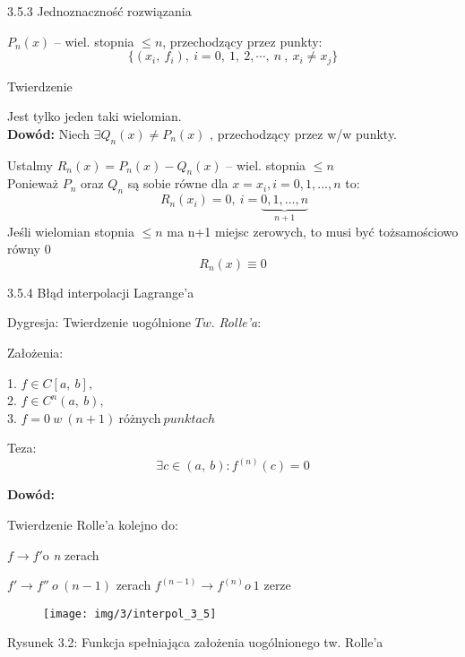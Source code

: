 \begin{frame}{3.5.3 Jednoznaczność rozwiązania}

$P_{n}(x)$ -- wiel. stopnia $\leq n$, przechodzący przez punkty:
$$
\{(x_{i},\ f_{i}),\ i=0,\ 1,\ 2,\cdots ,\ n\ ,\ x_{i}\neq x_{j}\}
$$

\begin{block}{Twierdzenie}

Jest tylko jeden taki wielomian.\\
\vspace{2mm}
\textbf{Dowód:} Niech $\exists Q_{n}(x)\neq P_{n}(x)$ , przechodzący przez w/w punkty.

Ustalmy $R_{n}(x)=P_{n}(x) - Q_{n}(x)$ -- wiel. stopnia $\leq n$\\
Ponieważ $P_{n}$ oraz $Q_{n}$ są sobie równe dla $x=x_i, i=0,1,...,n$ to:
$$
 \: R_{n}(x_{i})=0,\ i=\underbrace{0,1, \dots, n}_{n+1}
$$
Jeśli wielomian  stopnia $\leq n$ ma n+1 miejsc zerowych, to musi być tożsamościowo równy $0$ 
$$
R_{n}(x) \equiv 0
$$
\end{block}
\end{frame}

\begin{frame}{3.5.4 Błąd interpolacji Lagrange'a}

\begin{block}
{Dygresja: Twierdzenie uogólnione $Tw$. {\it Rolle'a}:}

Założenia:
\begin{center}
1. $f\in C[a,\ b],$ \\
2. $f\in C^{n}(a,\ b),$  \\
3. $f=0\: w\: (n+1)\: $różnych$ \:punktach$
\end{center}


Teza:
$$
\exists c\in(a,\ b):f^{(n)}(c)=0
$$
\end{block}
\textbf{Dowód:}

Twierdzenie Rolle'a kolejno do:

$f \rightarrow f'\mathrm{o}$ {\it n} zerach

$f' \rightarrow f'' \:o\:(n-1)$ zerach \newline
$f^{(n-1)} \rightarrow f^{(n)} o\: 1$ zerze
 \end{frame}

 \begin{frame}
 \begin{figure}[h]
			\texttt{[image: img/3/interpol\_3\_5]}
	\end{figure}
Rysunek 3.2: Funkcja spełniająca założenia uogólnionego tw. Rolle'a 
 \end{frame}



